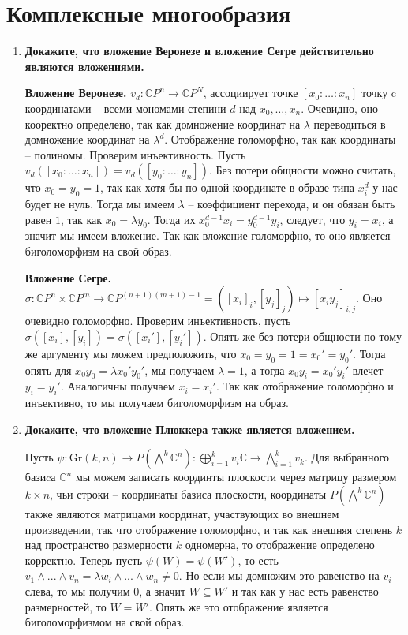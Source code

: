 \documentclass{article}
\begin{document}
\section{Комплексные многообразия}
\begin{enumerate}
    \item \textbf{Докажите, что вложение Веронезе и вложение Сегре действительно
        являются вложениями.}

        \textbf{Вложение Веронезе.} $v_d:\mathbb CP^n\rightarrow\mathbb CP^N$,
        ассоциирует точке $[x_0:\ldots:x_n]$ точку c координатами – всеми мономами
        степини $d$ над $x_0,\ldots,x_n$. Очевидно, оно кооректно определено, так
        как домножение координат на $\lambda$ переводиться в домножение координат
        на $\lambda^d$. Отображение голоморфно, так как координаты – полиномы.
        Проверим инъективность. Пусть $v_d([x_0:\ldots:x_n])=v_d([y_0:\ldots:y_n])$.
        Без потери общности можно считать, что $x_0=y_0=1$, так как хотя бы по одной
        координате в образе типа $x_i^d$ у нас будет не нуль. Тогда мы имеем $\lambda$
        – коэффициент перехода, и он обязан быть равен $1$, так как $x_0=\lambda y_0$.
        Тогда их $x_0^{d-1}x_i=y_0^{d-1}y_i$, следует, что $y_i=x_i$, а значит
        мы имеем вложение. Так как вложение голоморфно, то оно является
        биголоморфизм на свой образ.
        
        \textbf{Вложение Сегре.} $\sigma:\mathbb CP^n\times\mathbb CP^m
        \rightarrow\mathbb CP^{(n+1)(m+1)−1}=([x_i]_i,[y_j]_j)\mapsto[x_iy_j]_{i,j}$.
        Оно очевидно голоморфно. Проверим инъективность, пусть $\sigma([x_i],[y_i])
        =\sigma([x_i'],[y_i'])$. Опять же без потери общности по тому же аргументу
        мы можем предположить, что $x_0=y_0=1=x_0'=y_0'$. Тогда опять для $x_0y_0
        =\lambda x_0'y_0'$, мы получаем $\lambda=1$, а тогда $x_0y_i=x_0'y_i'$
        влечет $y_i=y_i'$. Аналогичны получаем $x_i=x_i'$. Так как отображение
        голоморфно и инъективно, то мы получаем биголоморфизм на образ.

    \item \textbf{Докажите, что вложение Плюккера также является вложением.}

        Пусть $\psi:\text{Gr}(k,n)\rightarrow P(\bigwedge^k\mathbb C^n):
        \bigoplus_{i=1}^k v_i\mathbb C\rightarrow \bigwedge_{i=1}^k v_k$.
        Для выбранного базиcа $\mathbb C^n$ мы можем записать координты
        плоскости через матрицу размером $k\times n$, чьи строки – координаты
        базиса плоскости, координаты $P(\bigwedge^k\mathbb C^n)$ также являются
        матрицами координат, участвующих во внешнем произведении, так что
        отображение голоморфно, и так как внешняя степень $k$ над пространство
        размерности $k$ одномерна, то отображение определено корректно. Теперь
        пусть $\psi(W)=\psi(W')$, то есть $v_1\wedge...\wedge v_n=\lambda w_i\wedge...
        \wedge w_n\neq 0$. Но если мы домножим это равенство на $v_i$ слева, то
        мы получим $0$, а значит $W\subseteq W'$ и так как у нас есть равенство
        размерностей, то $W=W'$. Опять же это отображение является биголоморфизмом
        на свой образ.

\end{enumerate}
\end{document}
